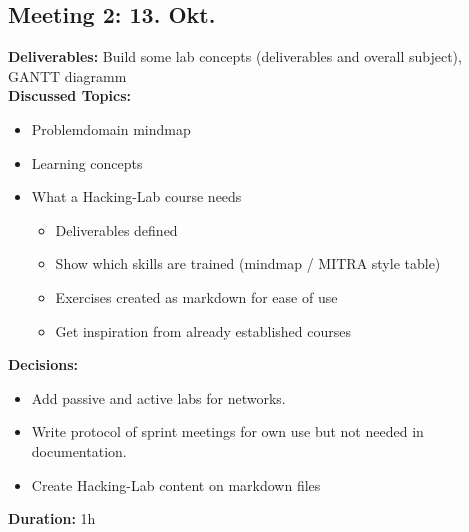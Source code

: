 \subsection*{Meeting 2: 13. Okt.}
\textbf{Deliverables:} Build some lab concepts (deliverables and overall subject), GANTT diagramm \\
\textbf{Discussed Topics:} 
\begin{itemize}
    \item Problemdomain mindmap
    \item Learning concepts
    \item What a Hacking-Lab course needs
    \begin{itemize}
        \item Deliverables defined
        \item Show which skills are trained (mindmap / MITRA style table)
        \item Exercises created as markdown for ease of use 
        \item Get inspiration from already established courses
    \end{itemize}
\end{itemize}
\textbf{Decisions:} 
\begin{itemize}
    \item Add passive and active labs for networks.
    \item Write protocol of sprint meetings for own use but not needed in documentation.
    \item Create Hacking-Lab content on markdown files
\end{itemize} 
\textbf{Duration:} 1h

\newpage
